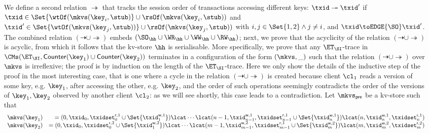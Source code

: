 We define a second relation $\twoheadrightarrow$ that tracks the session order of transactions accessing different keys: 
$\txid \twoheadrightarrow \txid'$ if $\txid \in \Set{\wtOf(\mkvs(\key_{i}, \stub)} \cup \rsOf(\mkvs(\key_{i}, \stub))$ 
and $\txid' \in \Set{\wtOf(\mkvs(\key_{j}, \stub))} \cup \rsOf(\mkvs(\key_{j}, \stub))$ with $i,j \in \Set{1,2} \land j \neq i$,  
and $\txid \toEDGE{\SO} \txid'$. The combined relation $(\dashrightarrow \cup \twoheadrightarrow)$ embeds 
$(\SO_{\hh} \cup \WR_{\hh} \cup \WW_{\hh} \cup \RW_{\hh})$; next, we prove that the acyclicity of the relation $(\dashrightarrow \cup \twoheadrightarrow)$ 
is acyclic, from which it follows that the kv-store $\hh$ is serialisable. More specifically, we prove that any $\ET_{\SI}$-trace
in $\CMs(\ET_{\SI}, \mathsf{Counter}(\key_1) \cup \mathsf{Counter}(\key_2))$ terminates in a configuration of the form $(\mkvs, \_)$ 
such that the relation $(\dashrightarrow \cup \twoheadrightarrow)$ over $\mkvs$ is irreflexive; the proof is by induction on the 
length of the $\ET_{\SI}$-trace. Here we only show the details of the inductive step of the proof in the most interesting case, 
that is one where a cycle in the relation $(\dashrightarrow \cup \twoheadrightarrow)$ is created because 
client $\cl_{1}$ reads a version of some key, e.g. $\key_{1}$, after accessing the other, e.g. $\key_{2}$, and the order 
of such operations seemingly contradicts the order of the versions of $\key_{1}, \key_{2}$ observed by another client 
$\cl_{2}$: as we will see shortly, this case leads to a contradiction. 
Let $\mkvs_{\mathsf{pre}}$ be a kv-store such that 
\[
\begin{array}{lr}
\mkvs(\key_{1}) & = (0, \txid_{0}, \txidset^{\mathsf{r},1}_{0} \cup \Set{\txid^{\mathsf{w},1}_1}) 
	\lcat \cdots \lcat (n-1, \txid^{\mathsf{w},1}_{n-1}, \txidset^{\mathsf{r},1}_{n-1} \cup \Set{\txid^{\mathsf{w},1}_n})
	\lcat (n, \txid^{\mathsf{w},1}_n, \txidset^{\mathsf{r},1}_{n})\\
\mkvs(\key_{2}) & = (0, \txid_{0}, \txidset^{\mathsf{r},2}_{0} \cup \Set{\txid^{\mathsf{w},2}_1}) 
	\lcat \cdots \lcat (m-1, \txid^{\mathsf{w},2}_{m-1}, \txidset^{\mathsf{r},1}_{m-1} \cup \Set{\txid^{\mathsf{w},2}_m})
	\lcat (m, \txid^{\mathsf{w},2}_m, \txidset^{\mathsf{r},2}_{m})
\end{array}
\]
